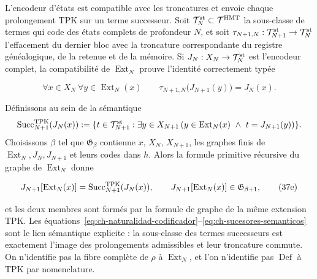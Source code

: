 L’encodeur d’états est compatible avec les troncatures et envoie chaque
prolongement TPK sur un terme successeur. Soit
\(\mathcal T_N^{\rm st}\subset\mathcal T^{\rm HMT}\) la sous-classe de termes
qui code des états complets de profondeur \(N\), et soit
\(\tau_{N+1,N}:\mathcal T_{N+1}^{\rm st}\to\mathcal T_N^{\rm st}\) l’effacement
du dernier bloc avec la troncature correspondante du registre généalogique,
de la retenue et de la mémoire. Si \(J_N:X_N\to\mathcal T_N^{\rm st}\) est l’encodeur
complet, la compatibilité de \(\operatorname{Ext}_N\) prouve l’identité
correctement typée

\[
 \forall x\in X_N\ \forall y\in\operatorname{Ext}_N(x)\qquad
 \tau_{N+1,N}\bigl(J_{N+1}(y)\bigr)=J_N(x).
\tag{37e$_0$}\label{eq:ch-naturalidad-codificador}
\]

Définissons au sein de la sémantique
\[
 \operatorname{Succ}^{\rm TPK}_{N+1}(J_N(x)):=
 \{t\in\mathcal T_{N+1}^{\rm st}:\exists y\in X_{N+1}\,
   (y\in\operatorname{Ext}_N(x)\ \wedge\ t=J_{N+1}(y))\}.
\]
Choisissons \(\beta\) tel que \(\mathfrak G_\beta\) contienne \(x\), \(X_N\),
\(X_{N+1}\), les graphes finis de
\(\operatorname{Ext}_N,J_N,J_{N+1}\) et leurs codes dans \(h\). Alors la
formule primitive récursive du graphe de \(\operatorname{Ext}_N\) donne

\[
 J_{N+1}[\operatorname{Ext}_N(x)]
 =\operatorname{Succ}^{\rm TPK}_{N+1}(J_N(x)),
 \qquad
 J_{N+1}[\operatorname{Ext}_N(x)]
 \in\mathfrak G_{\beta+1},
\tag{37e}\label{eq:ch-sucesores-semanticos}
\]

et les deux membres sont formés par la formule de graphe de la même extension
TPK. Les équations~\eqref{eq:ch-naturalidad-codificador}--\eqref{eq:ch-sucesores-semanticos} sont le lien sémantique explicite : la
sous-classe des termes successeurs est exactement l’image des prolongements
admissibles et leur troncature commute. On n’identifie pas la fibre complète de
\(\rho\) à \(\operatorname{Ext}_N\), et l’on n’identifie pas
\(\operatorname{Def}\) à TPK par nomenclature.

